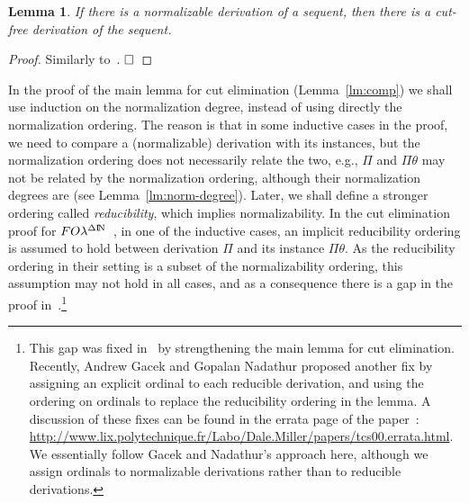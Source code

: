 \documentclass[preprint]{elsarticle}
\newcommand{\FOL   }{FO\lambda}
\newcommand{\FOLDN }{\FOL^{\Delta\N}}
\newcommand{\N}{{\rm I} \! {\rm N}}
\newtheorem{lemma}[thm]{Lemma}
\def\qed{$\hfill\Box$}
\begin{document}
\begin{lemma}
  \label{lm:norm-cut-free}
  If there is a normalizable derivation of a sequent, then there is a
  cut-free derivation of the sequent.
\end{lemma}
\begin{proof} Similarly to~\cite{mcdowell00tcs}.  \qed
\end{proof}

In the proof of the main lemma for cut elimination
(Lemma~\ref{lm:comp}) we shall use induction on the normalization degree,
instead of using directly the normalization ordering. The reason is
that in some inductive cases in the proof, we need to compare a
(normalizable) derivation with its instances, but the normalization
ordering does not necessarily relate the two, e.g., $\Pi$ and
$\Pi\theta$ may not be related by the normalization ordering, although
their normalization degrees are (see Lemma~\ref{lm:norm-degree}).
Later, we shall define a stronger ordering called \emph{reducibility},
which implies normalizability. In the cut elimination proof for
$\FOLDN$~\cite{mcdowell00tcs}, in one of the inductive cases, an
implicit reducibility ordering is assumed to hold between derivation
$\Pi$ and its instance $\Pi\theta$. As the reducibility ordering in
their setting is a subset of the normalizability ordering, this
assumption may not hold in all cases, and as a consequence there is a
gap in the proof in~\cite{mcdowell00tcs}.\footnote{ This gap was fixed
  in~\cite{tiu04phd} by strengthening the main lemma for cut
  elimination. Recently, Andrew Gacek and Gopalan Nadathur proposed
  another fix by assigning an explicit ordinal to each reducible
  derivation, and using the ordering on ordinals to replace the
  reducibility ordering in the lemma.  A discussion of these fixes can
  be found in the errata page of the paper~\cite{mcdowell00tcs}:
  \mbox{\url{http://www.lix.polytechnique.fr/Labo/Dale.Miller/papers/tcs00.errata.html}}.
  We essentially follow Gacek and Nadathur's approach here, although we
  assign ordinals to normalizable derivations rather than to reducible
  derivations.  }
\end{document}
